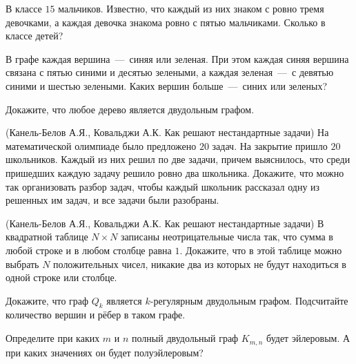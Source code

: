 	
\begin{exersize}
	В классе $15$ мальчиков. Известно, что каждый из них знаком с ровно тремя девочками, 
	а каждая девочка знакома ровно с пятью мальчиками. Сколько в классе детей?
\end{exersize}

\begin{exersize}
	В графе каждая вершина~---~синяя или зеленая. При этом каждая синяя вершина связана с 
	пятью синими и десятью зелеными, а каждая зеленая~---~с девятью синими и шестью зелеными. 
	Каких вершин больше~---~синих или зеленых?	
\end{exersize}

\begin{exersize}
	Докажите, что любое дерево является двудольным графом.
\end{exersize}

\begin{exersize}(Канель-Белов А.Я., Ковальджи А.К. Как решают нестандартные задачи)
	На математической олимпиаде было предложено $20$ задач. На закрытие пришло $20$ школьников. 
	Каждый из них решил по две задачи, причем выяснилось, что среди пришедших каждую задачу решило ровно два школьника. 
	Докажите, что можно так организовать разбор задач, чтобы каждый школьник рассказал одну из решенных им задач, 
	и все задачи были разобраны.
\end{exersize}

\begin{exersize}(Канель-Белов А.Я., Ковальджи А.К. Как решают нестандартные задачи)
	В квадратной таблице $N \times N$ записаны неотрицательные числа так, что сумма в любой строке и в 
	любом столбце равна $1$. Докажите, что в этой таблице можно выбрать $N$ положительных чисел, 
	никакие два из которых не будут находиться в одной строке или столбце.
\end{exersize}


\begin{exersize}
	Докажите, что граф $Q_k$ является $k$-регулярным двудольным графом. Подсчитайте количество вершин и рёбер в таком графе.
\end{exersize}

\begin{exersize}
	Определите при каких $m$ и $n$ полный двудольный граф $K_{m, n}$ будет эйлеровым. А при каких значениях он будет полуэйлеровым?
\end{exersize}


